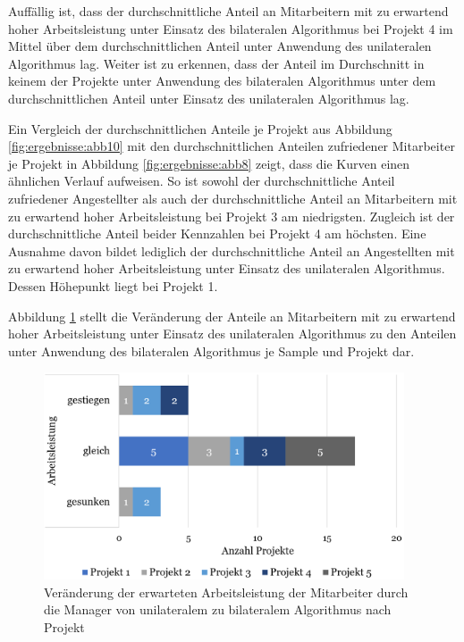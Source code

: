 Auffällig ist, dass der durchschnittliche Anteil an Mitarbeitern mit zu erwartend hoher Arbeitsleistung unter Einsatz des bilateralen Algorithmus bei Projekt 4 im Mittel über dem durchschnittlichen Anteil unter Anwendung des unilateralen Algorithmus lag.
Weiter ist zu erkennen, dass der Anteil im Durchschnitt in keinem der Projekte unter Anwendung des bilateralen Algorithmus unter dem durchschnittlichen Anteil unter Einsatz des unilateralen Algorithmus lag.

Ein Vergleich der durchschnittlichen Anteile je Projekt aus Abbildung \ref{fig:ergebnisse:abb10} mit den durchschnittlichen Anteilen zufriedener Mitarbeiter je Projekt in Abbildung \ref{fig:ergebnisse:abb8} zeigt, dass die Kurven einen ähnlichen Verlauf aufweisen.
So ist sowohl der durchschnittliche Anteil zufriedener Angestellter als auch der durchschnittliche Anteil an Mitarbeitern mit zu erwartend hoher Arbeitsleistung bei Projekt 3 am niedrigsten.
Zugleich ist der durchschnittliche Anteil beider Kennzahlen bei Projekt 4 am höchsten.
Eine Ausnahme davon bildet lediglich der durchschnittliche Anteil an Angestellten mit zu erwartend hoher Arbeitsleistung unter Einsatz des unilateralen Algorithmus.
Dessen Höhepunkt liegt bei Projekt 1.

Abbildung \ref{fig:ergebnisse:abb11} stellt die Veränderung der Anteile an Mitarbeitern mit zu erwartend hoher Arbeitsleistung unter Einsatz des unilateralen Algorithmus zu den Anteilen unter Anwendung des bilateralen Algorithmus je Sample und Projekt dar.

\begin{figure}[H]
    \centering
	\includegraphics[width=0.95\textwidth]{gfx/verhaeltnis-a-projekte.png}
	\caption[Veränderung der erwarteten Arbeitsleistung der Mitarbeiter durch die Manager von unilateralem zu bilateralem Algorithmus nach Projekt]{Veränderung der erwarteten Arbeitsleistung der Mitarbeiter durch die Manager von unilateralem zu bilateralem Algorithmus nach Projekt}
	\label{fig:ergebnisse:abb11}
\end{figure}

